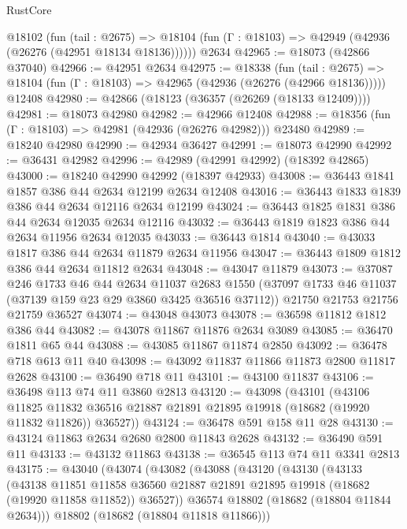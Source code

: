 \begin{lexlean}{RustCore}
\begin{coremodule}
    @18102
      (fun (tail : @2675) =>
      @18104 (fun (Γ : @18103) => @42949 (@42936 (@26276 (@42951 @18134 @18136))))))
    @2634
@42965 := @18073 (@42866 @37040)
@42966 := @42951 @2634
@42975 := @18338
    (fun (tail : @2675) => @18104 (fun (Γ : @18103) => @42965 (@42936 (@26276 (@42966 @18136)))))
    @12408
@42980 := @42866 (@18123 (@36357 (@26269 (@18133 @12409))))
@42981 := @18073 @42980
@42982 := @42966 @12408
@42988 := @18356 (fun (Γ : @18103) => @42981 (@42936 (@26276 @42982))) @23480
@42989 := @18240 @42980
@42990 := @42934 @36427
@42991 := @18073 @42990
@42992 := @36431 @42982
@42996 := @42989 (@42991 @42992) (@18392 @42865)
@43000 := @18240 @42990 @42992 (@18397 @42933)
@43008 := @36443 @1841 @1857 @386 @44 @2634 @12199 @2634 @12408
@43016 := @36443 @1833 @1839 @386 @44 @2634 @12116 @2634 @12199
@43024 := @36443 @1825 @1831 @386 @44 @2634 @12035 @2634 @12116
@43032 := @36443 @1819 @1823 @386 @44 @2634 @11956 @2634 @12035
@43033 := @36443 @1814
@43040 := @43033 @1817 @386 @44 @2634 @11879 @2634 @11956
@43047 := @36443 @1809 @1812 @386 @44 @2634 @11812 @2634
@43048 := @43047 @11879
@43073 := @37087
    @246
    @1733
    @46
    @44
    @2634
    @11037
    @2683
    @1550
    (@37097 @1733 @46 @11037 (@37139 @159 @23 @29 @3860 @3425 @36516 @37112))
    @21750
    @21753
    @21756
    @21759
    @36527
@43074 := @43048 @43073
@43078 := @36598 @11812 @1812 @386 @44
@43082 := @43078 @11867 @11876 @2634 @3089
@43085 := @36470 @1811 @65 @44
@43088 := @43085 @11867 @11874 @2850
@43092 := @36478 @718 @613 @11 @40
@43098 := @43092 @11837 @11866 @11873 @2800 @11817 @2628
@43100 := @36490 @718 @11
@43101 := @43100 @11837
@43106 := @36498 @113 @74 @11 @3860 @2813
@43120 := @43098
    (@43101
      (@43106
        @11825
        @11832
        @36516
        @21887
        @21891
        @21895
        @19918
        (@18682 (@19920 @11832 @11826))
        @36527))
@43124 := @36478 @591 @158 @11 @28
@43130 := @43124 @11863 @2634 @2680 @2800 @11843 @2628
@43132 := @36490 @591 @11
@43133 := @43132 @11863
@43138 := @36545 @113 @74 @11 @3341 @2813
@43175 := @43040
    (@43074
      (@43082
        (@43088
          (@43120
            (@43130
              (@43133
                (@43138
                  @11851
                  @11858
                  @36560
                  @21887
                  @21891
                  @21895
                  @19918
                  (@18682 (@19920 @11858 @11852))
                  @36527))
              @36574
              @18802
              (@18682 (@18804 @11844 @2634)))
            @18802
            (@18682 (@18804 @11818 @11866)))

\end{coremodule}
\end{lexlean}
